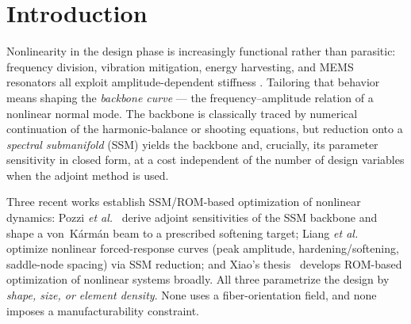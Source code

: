\documentclass[11pt]{article}
\begin{document}
\begin{abstract}
curl-feasible steered tow field reduces the relative amplitude detuning by $50\%$
at held linear frequency, a figure the SSM backbone, full-order EPMC, and
brute-force up/down frequency sweeps all confirm. The tangible consequence is a
resonator that stays linear to larger amplitude: the steering \emph{removes the
jump}, widening the panel's jump- and hysteresis-free operating range by
$1.42\times$ (and further with an added topology field), the property a resonant
sensor or harvester actually needs. The same adjoint, applied to the nonsymmetric
aeroelastic (piston-theory) operator on a \emph{conforming} finite element (needed once
bend--twist coupling twists the mode shapes --- a point at which a global-mode Ritz model
fails), recovers a \emph{supersonic panel-flutter} boundary by $9\times$ at held
frequency: off-axis fibers crater a uniform panel's flutter, and a steered field places
the same coupling to recover it. To our knowledge this is the first design of a
composite's \emph{nonlinear} backbone through a manufacturable fiber-orientation
field, and the verified framework is the contribution.
\end{abstract}

\section{Introduction}

Nonlinearity in the design phase is increasingly functional rather than
parasitic: frequency division, vibration mitigation, energy harvesting, and
MEMS resonators all exploit amplitude-dependent stiffness
\cite{shaw,touze}. Tailoring that behavior means shaping the
\emph{backbone curve} --- the frequency--amplitude relation of a nonlinear
normal mode. The backbone is classically traced by numerical continuation of
the harmonic-balance or shooting equations, but reduction onto a
\emph{spectral submanifold} (SSM) \cite{haller2016,jain2022} yields the backbone
and, crucially, its parameter sensitivity in closed form, at a cost independent
of the number of design variables when the adjoint method is used.

Three recent works establish SSM/ROM-based optimization of nonlinear dynamics:
Pozzi \emph{et al.}~\cite{pozzi2025} derive adjoint sensitivities of the
SSM backbone and shape a von~K\'arm\'an beam to a prescribed softening target;
Liang \emph{et al.}~\cite{liang2025} optimize nonlinear forced-response curves
(peak amplitude, hardening/softening, saddle-node spacing) via SSM reduction;
and Xiao's thesis~\cite{xiao2026} develops ROM-based optimization of nonlinear
systems broadly. All three parametrize the design by \emph{shape, size, or
element density}. None uses a fiber-orientation field, and none imposes a
manufacturability constraint.
\end{document}
